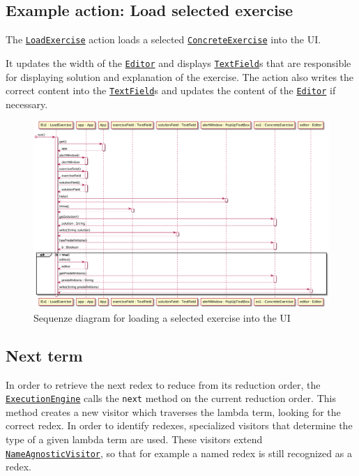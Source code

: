\subsection{Example action: Load selected exercise}
The \texttt{\hyperref[type:edu.kit.wavelength.client.view.action.LoadExercise]{LoadExercise}} 
action loads a selected \texttt{\hyperref[type:edu.kit.wavelength.client.view.exercise.ConcreteExercise]{ConcreteExercise}} into the UI.

It updates the width of the \texttt{\hyperref[type:edu.kit.wavelength.client.view.webui.component.Editor]{Editor}} and displays \texttt{\hyperref[type:edu.kit.wavelength.client.view.webui.component.TextField]{TextField}}s 
that are responsible for displaying solution and explanation of the exercise.
The action also writes the correct content into the \texttt{\hyperref[type:edu.kit.wavelength.client.view.webui.component.TextField]{TextField}}s and updates the content of the \texttt{\hyperref[type:edu.kit.wavelength.client.view.webui.component.Editor]{Editor}} if necessary.

\begin{figure}[H]
	\centering
	\includegraphics[width=\textwidth]{sequenceDiagrams/loadExercise.png}
	\caption{Sequenze diagram for loading a selected exercise into the UI}
\end{figure}

\subsection{Next term}
\label{sec:nt}
In order to retrieve the next redex to reduce from its reduction order, the
\texttt{\hyperref[type:edu.kit.wavelength.client.model.ExecutionEngine]{ExecutionEngine}}
calls the \texttt{next} method on the current reduction order. This method creates a new visitor which traverses
the lambda term, looking for the correct redex. In order to identify redexes,
specialized visitors that determine the type of a given lambda term are used.
These visitors extend \texttt{\hyperref[type:edu.kit.wavelength.client.model.term.NameAgnosticVisitor]{NameAgnosticVisitor}},
so that for example a named redex is still recognized as a redex.



